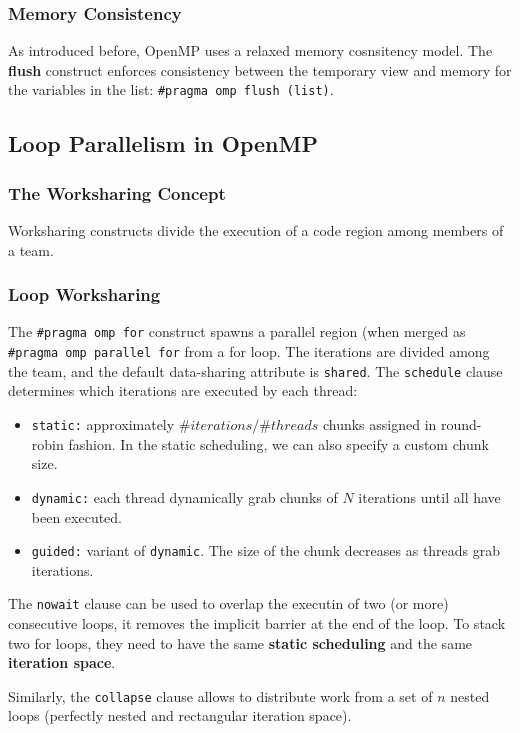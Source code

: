\subsubsection{Memory Consistency}

As introduced before, OpenMP uses a relaxed memory cosnsitency model.
The \textbf{flush} construct enforces consistency between the temporary view and memory for the variables in the list: \texttt{\#pragma omp flush (list)}.

\subsection{Loop Parallelism in OpenMP}

\subsubsection{The Worksharing Concept}
Worksharing constructs divide the execution of a code region among members of a team.

\subsubsection{Loop Worksharing}
The \texttt{\#pragma omp for} construct spawns a parallel region (when merged as \texttt{\#pragma omp parallel for} from a for loop.
The iterations are divided among the team, and the default data-sharing attribute is \texttt{shared}.
The \texttt{schedule} clause determines which iterations are executed by each thread:
\begin{itemize}
    \item \texttt{static:} approximately $\#iterations / \#threads$ chunks assigned in round-robin fashion. In the static scheduling, we can also specify a custom chunk size.
    \item \texttt{dynamic:} each thread dynamically grab chunks of $N$ iterations until all have been executed.
    \item \texttt{guided:} variant of \texttt{dynamic}. The size of the chunk decreases as threads grab iterations.
\end{itemize}

The \texttt{nowait} clause can be used to overlap the executin of two (or more) consecutive loops, it removes the implicit barrier at the end of the loop.
To stack two for loops, they need to have the same \textbf{static scheduling} and the same \textbf{iteration space}.

Similarly, the \texttt{collapse} clause allows to distribute work from a set of $n$ nested loops (perfectly nested and rectangular iteration space).

